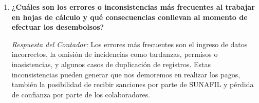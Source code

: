 \begin{enumerate}[leftmargin=*, label=\textbf{P\arabic*.}]
    \item \textbf{¿Cuáles son los errores o inconsistencias más frecuentes al trabajar en hojas de cálculo y qué consecuencias conllevan al momento de efectuar los desembolsos? }
    
    \textit{Respuesta del Contador:} Los errores más frecuentes son el ingreso de datos incorrectos, la omisión de incidencias como tardanzas, permisos o inasistencias, y algunos casos de duplicación de registros. Estas inconsistencias pueden generar que nos demoremos en realizar los pagos, también la posibilidad de recibir sanciones por parte de SUNAFIL y pérdida de confianza por parte de los colaboradores.

\end{enumerate}